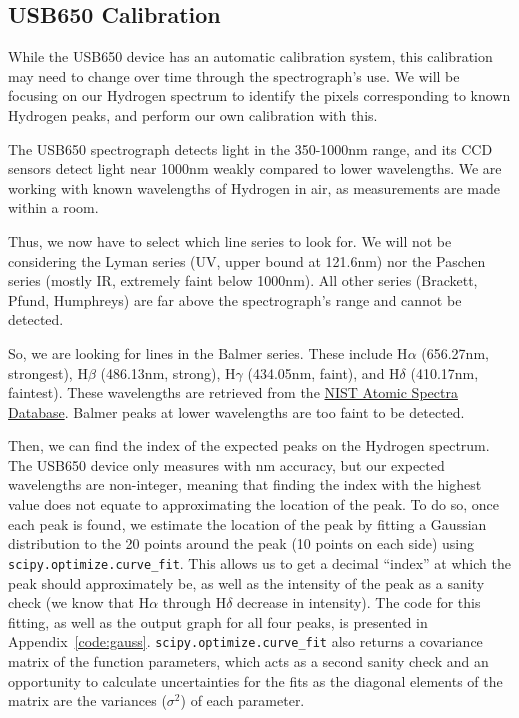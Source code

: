 \documentclass[twocolumn]{aastex702}
\begin{document}
		\subsection{USB650 Calibration}\label{ssec:USB650-cal}
			
			While the USB650 device has an automatic calibration system, this calibration may need to change over time through the spectrograph's use. We will be focusing on our Hydrogen spectrum to identify the pixels corresponding to known Hydrogen peaks, and perform our own calibration with this.
			
			The USB650 spectrograph detects light in the 350-1000nm range, and its CCD sensors detect light near 1000nm weakly compared to lower wavelengths. We are working with known wavelengths of Hydrogen in air, as measurements are made within a room.
			
			Thus, we now have to select which line series to look for. We will not be considering the Lyman series (UV, upper bound at 121.6nm) nor the Paschen series (mostly IR, extremely faint below 1000nm). All other series (Brackett, Pfund, Humphreys) are far above the spectrograph's range and cannot be detected.
			
			So, we are looking for lines in the Balmer series. These include H$\alpha$ (656.27nm, strongest), H$\beta$ (486.13nm, strong), H$\gamma$ (434.05nm, faint), and H$\delta$ (410.17nm, faintest). These wavelengths are retrieved from the \href{https://physics.nist.gov/PhysRefData/ASD/lines_form.html}{NIST Atomic Spectra Database}. Balmer peaks at lower wavelengths are too faint to be detected.
			
			Then, we can find the index of the expected peaks on the Hydrogen spectrum. The USB650 device only measures with nm accuracy, but our expected wavelengths are non-integer, meaning that finding the index with the highest value does not equate to approximating the location of the peak. To do so, once each peak is found, we estimate the location of the peak by fitting a Gaussian distribution to the 20 points around the peak (10 points on each side) using \texttt{scipy.optimize.curve\_fit}. This allows us to get a decimal ``index'' at which the peak should approximately be, as well as the intensity of the peak as a sanity check (we know that H$\alpha$ through H$\delta$ decrease in intensity). The code for this fitting, as well as the output graph for all four peaks, is presented in Appendix~\ref{code:gauss}. \texttt{scipy.optimize.curve\_fit} also returns a covariance matrix of the function parameters, which acts as a second sanity check and an opportunity to calculate uncertainties for the fits as the diagonal elements of the matrix are the variances ($\sigma^2$) of each parameter.
			
\end{document}
